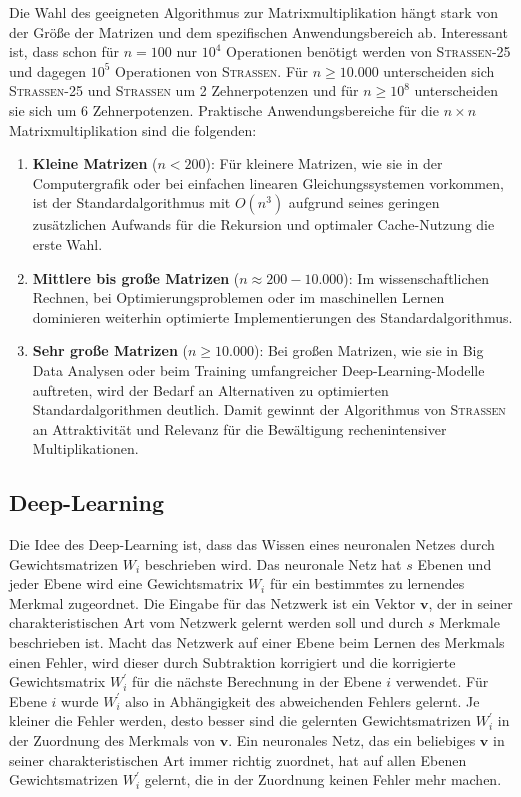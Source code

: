 \documentclass{report}
\numberwithin{equation}{section}
\begin{document}
Die Wahl des geeigneten Algorithmus zur Matrixmultiplikation hängt stark von der Größe der Matrizen und dem spezifischen Anwendungsbereich ab. Interessant ist, dass schon für $n = 100$ nur $10^{4}$ Operationen benötigt werden von \textsc{Strassen-25} und dagegen $10^{5}$ Operationen von \textsc{Strassen}. Für $n \geq 10.000$ unterscheiden sich \textsc{Strassen-25} und \textsc{Strassen} um 2 Zehnerpotenzen und für $n \geq 10^8$ unterscheiden sie sich um 6 Zehnerpotenzen. Praktische Anwendungsbereiche für die $n \times n$ Matrixmultiplikation sind die folgenden:

\begin{enumerate}
	\item \textbf{Kleine Matrizen} ($n < 200$): Für kleinere Matrizen, wie sie in der Computergrafik oder bei einfachen linearen Gleichungssystemen vorkommen, ist der Standardalgorithmus mit $O(n^3)$ aufgrund seines geringen zusätzlichen Aufwands für die Rekursion und optimaler Cache-Nutzung die erste Wahl.
	
	\item \textbf{Mittlere bis große Matrizen} ($n \approx 200 - 10.000$): Im wissenschaftlichen Rechnen, bei Optimierungsproblemen oder im maschinellen Lernen dominieren weiterhin optimierte Implementierungen des Standardalgorithmus.
	
	\item \textbf{Sehr große Matrizen} ($n \ge 10.000$): Bei großen Matrizen, wie sie in Big Data Analysen oder beim Training umfangreicher Deep-Learning-Modelle auftreten, wird der Bedarf an Alternativen zu optimierten Standardalgorithmen deutlich. Damit gewinnt der Algorithmus von \textsc{Strassen} an Attraktivität und Relevanz für die Bewältigung rechenintensiver Multiplikationen.
\end{enumerate}

\subsection{Deep-Learning}
Die Idee des Deep-Learning ist, dass das Wissen eines neuronalen Netzes durch Gewichtsmatrizen $W_i$ beschrieben wird. Das neuronale Netz hat $s$ Ebenen und jeder Ebene wird eine Gewichtsmatrix $W_i$ für ein bestimmtes zu lernendes Merkmal zugeordnet. Die Eingabe für das Netzwerk ist ein Vektor $\boldsymbol{v}$, der in seiner charakteristischen Art vom Netzwerk gelernt werden soll und durch $s$ Merkmale beschrieben ist. Macht das Netzwerk auf einer Ebene beim Lernen des Merkmals einen Fehler, wird dieser durch Subtraktion korrigiert und die korrigierte Gewichtsmatrix $W^{'}_i$ für die nächste Berechnung in der Ebene $i$ verwendet. Für Ebene $i$ wurde $W^{'}_i$ also in Abhängigkeit des abweichenden Fehlers gelernt. Je kleiner die Fehler werden, desto besser sind die gelernten Gewichtsmatrizen $W^{'}_i$ in der Zuordnung des Merkmals von $\boldsymbol{v}$. Ein neuronales Netz, das ein beliebiges $\boldsymbol{v}$ in seiner charakteristischen Art immer richtig zuordnet, hat auf allen Ebenen Gewichtsmatrizen $W^{'}_i$ gelernt, die in der Zuordnung keinen Fehler mehr machen.
\end{document}
